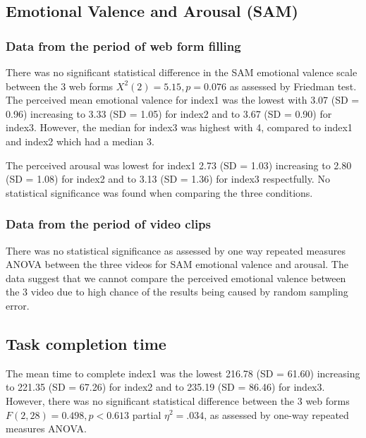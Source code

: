 \documentclass[../main/Feedback.tex]{subfiles}
\begin{document}
		\subsection{Emotional Valence and Arousal (SAM)}
		\subsubsection{Data from the period of web form filling}\leavevmode
		There was no significant statistical difference in the SAM emotional valence scale between the 3 web forms $X^{2}(2)=5.15,p=0.076$ as assessed by Friedman test. 
		The perceived mean emotional valence for index1 was the lowest with 3.07 (SD = 0.96) increasing to 3.33 (SD = 1.05) for index2 and to 3.67 (SD = 0.90) for index3. 
		However, the median for index3 was highest with 4, compared to index1 and index2 which had a median 3.
		
		The perceived arousal was lowest for index1 2.73 (SD = 1.03) increasing to 2.80 (SD = 1.08) for index2 and to 3.13 (SD = 1.36) for index3 respectfully. No statistical significance was found when comparing the three conditions. 
		\subsubsection{Data from the period of video clips}\leavevmode
		There was no statistical significance as assessed by one way repeated measures ANOVA between the three videos for SAM emotional valence and arousal. The data suggest that we cannot compare the perceived emotional valence between the 3 video due to high chance of the results being caused by random sampling error.
		\subsection{Task completion time}		
		The mean time to complete index1 was the lowest 216.78 (SD = 61.60) increasing to 221.35 (SD = 67.26) for index2 and to 235.19 (SD = 86.46) for index3. However, there was no significant statistical difference between the 3 web forms $F(2,28)=0.498, p<0.613$ partial $\eta^{2}=.034$, as assessed by one-way repeated measures ANOVA.
\end{document}
